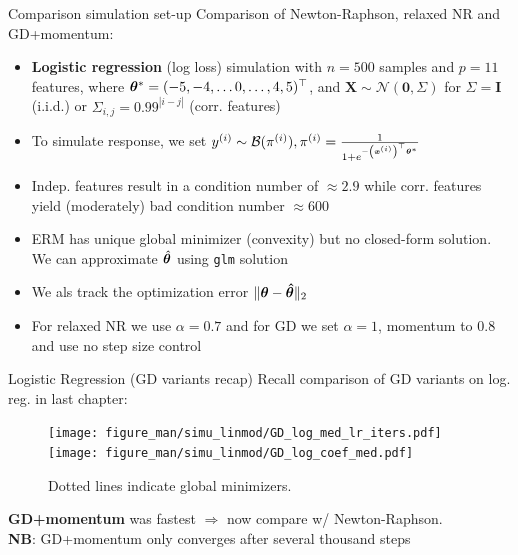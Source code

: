 \documentclass[11pt,compress,t,notes=noshow, xcolor=table]{beamer}
\begin{document}
\begin{vbframe}{Comparison simulation set-up}
Comparison of Newton-Raphson, relaxed NR and GD+momentum:
{\normalsize
\begin{itemize}\setlength{\itemsep}{0.75em} 
    \item \textbf{Logistic regression} (log loss) simulation with $n=500$ samples and $p=11$ features, where $\bm{\theta}^{\ast}=(-5,-4,\ldots0,\ldots,4,5)^{\top}$, and $\bm{X} \sim \mathcal{N}(\bm{0}, \Sigma)$ for $\Sigma=\bm{I}$ (i.i.d.) or $\Sigma_{i,j}=0.99^{|i-j|}$ (corr. features)
    \item To simulate response, we set $y^{(i)} \sim \mathcal{B}(\pi^{(i)}), \pi^{(i)} = \frac{1}{1+e^{-\left(\bm{x}^{(i)}\right)^{\top}\bm{\theta}^{\ast}}}$
    \item Indep. features result in a condition number of $\approx 2.9$ while corr. features yield (moderately) bad condition number $\approx 600$
    \item ERM has unique global minimizer (convexity) but no closed-form solution. We can approximate $\hat{\bm{\theta}}$ using \texttt{glm} solution
    \item We als track the optimization error $\Vert \bm{\theta} - \bm{\hat{\theta}} \Vert_2$
    \item For relaxed NR we use $\alpha=0.7$ and for GD we set $\alpha=1$, momentum to $0.8$ and use no step size control
\end{itemize}
}
\end{vbframe}




\begin{vbframe}{Logistic Regression (GD variants recap)}
\vspace{-0.3cm}
Recall comparison of GD variants on log. reg. in last chapter:
\begin{figure}
            \texttt{[image: figure\_man/simu\_linmod/GD\_log\_med\_lr\_iters.pdf]} \\
             \texttt{[image: figure\_man/simu\_linmod/GD\_log\_coef\_med.pdf]}\\
            \begin{footnotesize}
            Dotted lines indicate global minimizers.
            \end{footnotesize}
\end{figure}
\vspace{-0.2cm}
\textbf{GD+momentum} was fastest $\Rightarrow$ now compare w/ Newton-Raphson.\\
\textbf{NB}: GD+momentum only converges after several thousand steps
\end{vbframe}
\end{document}
